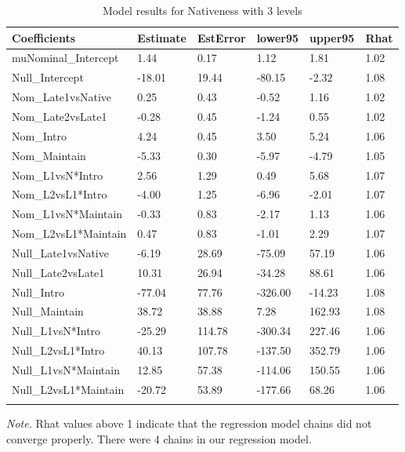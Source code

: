 \documentclass[]{elsarticle} %
\begin{document}
\begin{table}[hbt!]

\begin{center}
\begin{threeparttable}

\caption{\label{tab:unnamed-chunk-4}Model results for Nativeness with 3 levels}

\small{

\begin{tabular}{llllll}
\toprule
Coefficients & \multicolumn{1}{c}{Estimate} & \multicolumn{1}{c}{EstError} & \multicolumn{1}{c}{lower95} & \multicolumn{1}{c}{upper95} & \multicolumn{1}{c}{Rhat}\\
\midrule
muNominal\_Intercept & 1.44 & 0.17 & 1.12 & 1.81 & 1.02\\
Null\_Intercept & -18.01 & 19.44 & -80.15 & -2.32 & 1.08\\
Nom\_Late1vsNative & 0.25 & 0.43 & -0.52 & 1.16 & 1.02\\
Nom\_Late2vsLate1 & -0.28 & 0.45 & -1.24 & 0.55 & 1.02\\
Nom\_Intro & 4.24 & 0.45 & 3.50 & 5.24 & 1.06\\
Nom\_Maintain & -5.33 & 0.30 & -5.97 & -4.79 & 1.05\\
Nom\_L1vsN*Intro & 2.56 & 1.29 & 0.49 & 5.68 & 1.07\\
Nom\_L2vsL1*Intro & -4.00 & 1.25 & -6.96 & -2.01 & 1.07\\
Nom\_L1vsN*Maintain & -0.33 & 0.83 & -2.17 & 1.13 & 1.06\\
Nom\_L2vsL1*Maintain & 0.47 & 0.83 & -1.01 & 2.29 & 1.07\\
Null\_Late1vsNative & -6.19 & 28.69 & -75.09 & 57.19 & 1.06\\
Null\_Late2vsLate1 & 10.31 & 26.94 & -34.28 & 88.61 & 1.06\\
Null\_Intro & -77.04 & 77.76 & -326.00 & -14.23 & 1.08\\
Null\_Maintain & 38.72 & 38.88 & 7.28 & 162.93 & 1.08\\
Null\_L1vsN*Intro & -25.29 & 114.78 & -300.34 & 227.46 & 1.06\\
Null\_L2vsL1*Intro & 40.13 & 107.78 & -137.50 & 352.79 & 1.06\\
Null\_L1vsN*Maintain & 12.85 & 57.38 & -114.06 & 150.55 & 1.06\\
Null\_L2vsL1*Maintain & -20.72 & 53.89 & -177.66 & 68.26 & 1.06\\
\bottomrule
\addlinespace
\end{tabular}

}

\begin{tablenotes}[para]
\normalsize{\textit{Note.} Rhat values above 1 indicate that the regression model chains did not converge properly. There were 4 chains in our regression model.}
\end{tablenotes}

\end{threeparttable}
\end{center}

\end{table}
\end{document}
